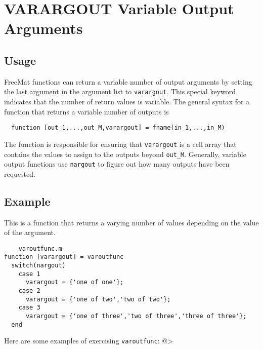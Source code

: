 \section{VARARGOUT Variable Output Arguments}

\subsection{Usage}

FreeMat functions can return a variable number of output arguments
by setting the last argument in the argument list to \verb|varargout|.
This special keyword indicates that the number of return values
is variable.  The general syntax for a function that returns
a variable number of outputs is
\begin{verbatim}
  function [out_1,...,out_M,varargout] = fname(in_1,...,in_M)
\end{verbatim}
The function is responsible for ensuring that \verb|varargout| is
a cell array that contains the values to assign to the outputs
beyond \verb|out_M|.  Generally, variable output functions use
\verb|nargout| to figure out how many outputs have been requested.
\subsection{Example}

This is a function that returns a varying number of values
depending on the value of the argument.
\begin{verbatim}
    varoutfunc.m
function [varargout] = varoutfunc
  switch(nargout)
    case 1
      varargout = {'one of one'};
    case 2
      varargout = {'one of two','two of two'};
    case 3
      varargout = {'one of three','two of three','three of three'};
  end
\end{verbatim}
Here are some examples of exercising \verb|varoutfunc|:
@>
